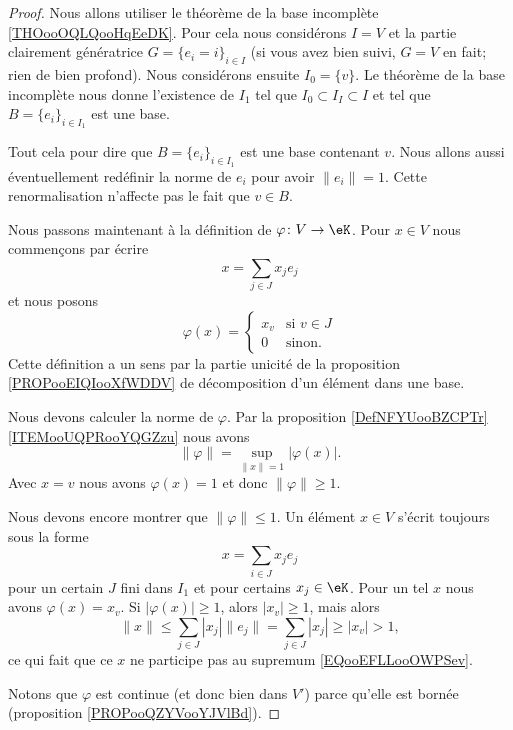 \begin{proof}
    Nous allons utiliser le théorème de la base incomplète \ref{THOooOQLQooHqEeDK}. Pour cela nous considérons \( I=V\) et la partie clairement génératrice \( G=\{ e_i=i \}_{i\in I}\) (si vous avez bien suivi, \( G=V\) en fait; rien de bien profond). Nous considérons ensuite \( I_0=\{ v \}\). Le théorème de la base incomplète nous donne l'existence de \( I_1\) tel que \( I_0\subset I_I\subset I\) et tel que \( B=\{ e_i \}_{i\in I_1}\) est une base.

    Tout cela pour dire que \( B=\{ e_i \}_{i\in I_1}\) est une base contenant \( v\). Nous allons aussi éventuellement redéfinir la norme de \( e_i\) pour avoir \( \| e_i \|=1\). Cette renormalisation n'affecte pas le fait que \( v\in B\).

    Nous passons maintenant à la définition de \( \varphi\colon V\to \eK\). Pour \( x\in V\) nous commençons par écrire
    \begin{equation}
        x=\sum_{j\in J}x_je_j
    \end{equation}
    et nous posons
    \begin{equation}
        \varphi(x)=\begin{cases}
            x_v    &   \text{si } v\in J\\
            0    &    \text{sinon. }
        \end{cases}
    \end{equation}
    Cette définition a un sens par la partie unicité de la proposition \ref{PROPooEIQIooXfWDDV} de décomposition d'un élément dans une base.

    Nous devons calculer la norme de \( \varphi\). Par la proposition \ref{DefNFYUooBZCPTr}\ref{ITEMooUQPRooYQGZzu} nous avons
    \begin{equation}        \label{EQooEFLLooOWPSev}
        \| \varphi \|=\sup_{\| x \|=1}| \varphi(x) |.
    \end{equation}
    Avec \( x=v\) nous avons \( \varphi(x)=1\) et donc \( \| \varphi \|\geq 1\).

    Nous devons encore montrer que \( \| \varphi \|\leq 1\). Un élément \( x\in V\) s'écrit toujours sous la forme
    \begin{equation}
        x=\sum_{i\in J}x_je_j
    \end{equation}
    pour un certain \( J\) fini dans \( I_1\) et pour certains \( x_j\in \eK\). Pour un tel \( x\) nous avons \( \varphi(x)=x_v\). Si \( |\varphi(x)|\geq 1\), alors \( | x_v |\geq 1\), mais alors
    \begin{equation}
        \| x \|\leq \sum_{j\in J}| x_j |\| e_j \|=\sum_{j\in J}| x_j |\geq | x_v |>1,
    \end{equation}
    ce qui fait que ce \( x\) ne participe pas au supremum \eqref{EQooEFLLooOWPSev}.

    Notons que \( \varphi\) est continue (et donc bien dans \( V'\)) parce qu'elle est bornée (proposition \ref{PROPooQZYVooYJVlBd}).
\end{proof}

